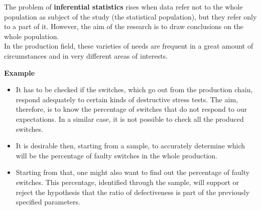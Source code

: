 
\begin{frame}
  \vspace*{.75cm}
  The problem of \textbf{inferential statistics} rises when data refer not to the whole population as subject of the study (the statistical population), but they refer only to a part of it. However, the aim of the research is to draw conclusions on the whole population. \\
  \vspace*{.75cm}
  In the production field, these varieties of needs are frequent in a great amount of circumstances and in very different areas of interests.\\
\end{frame}    

\begin{frame}
  \textbf{Example}\\
  \begin{itemize}
    \item It has to be checked if the switches, which go out from the production chain, respond adequately to certain kinds of destructive stress tests. The aim, therefore, is to know the percentage of switches that do not respond to our expectations. In a similar case, it is not possible to check all the produced switches.
    \vspace*{.25cm}
    \item It is desirable then, starting from a sample, to accurately determine which will be the percentage of faulty switches in the whole production. 
    \vspace*{.25cm}
    \item Starting from that, one might also want to find out the percentage of faulty switches. This percentage, identified through the sample, will support or reject the hypothesis that the ratio of defectiveness is part of the previously specified parameters.
  \end{itemize}
\end{frame}


